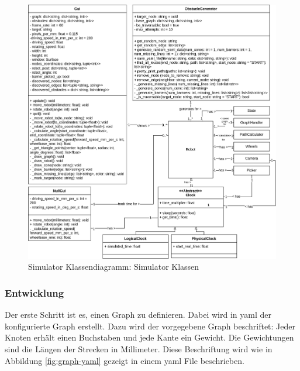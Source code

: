 \begin{figure}[H]
\centering
\includegraphics[width=\textwidth]{assets/informatik-prototyp/simulator/simulator-simulator-erd.png}
\caption{Simulator Klassendiagramm: Simulator Klassen}
\label{fig:simulator-classdia-sim}
\end{figure}

\subsubsection{Entwicklung}

Der erste Schritt ist es, einen Graph zu definieren. Dabei wird in \gls{yaml} der konfigurierte Graph erstellt. 
Dazu wird der vorgegebene Graph beschriftet: Jeder Knoten erhält einen Buchstaben und jede Kante ein Gewicht. Die Gewichtungen sind die Längen der Strecken in Millimeter. Diese Beschriftung wird wie in Abbildung \ref{fig:graph-yaml} gezeigt in einem \gls{yaml} File beschrieben.

